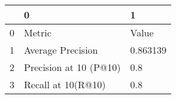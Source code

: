 \begin{tabular}{lll}
\toprule
{} &                       0 &         1 \\
\midrule
0 &                  Metric &     Value \\
1 &       Average Precision &  0.863139 \\
2 &  Precision at 10 (P@10) &       0.8 \\
3 &      Recall at 10(R@10) &       0.8 \\
\bottomrule
\end{tabular}
